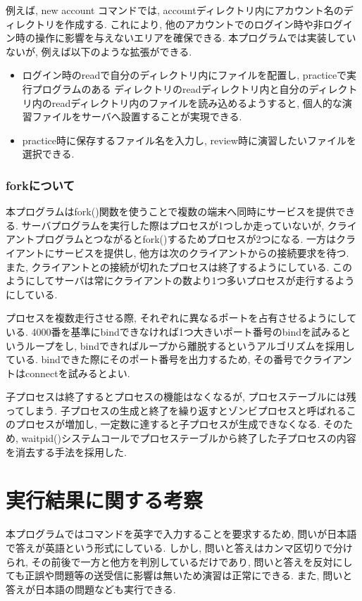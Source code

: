 \documentclass[a4j]{jarticle}
\begin{document}
例えば, new account コマンドでは, accountディレクトリ内にアカウント名のディレクトリを作成する. 
これにより, 他のアカウントでのログイン時や非ログイン時の操作に影響を与えないエリアを確保できる.
本プログラムでは実装していないが, 例えば以下のような拡張ができる.
\begin{itemize}
\item ログイン時のreadで自分のディレクトリ内にファイルを配置し, practiceで実行プログラムのある
ディレクトリのreadディレクトリ内と自分のディレクトリ内のreadディレクトリ内のファイルを読み込めるようすると, 
個人的な演習ファイルをサーバへ設置することが実現できる. 
\item practice時に保存するファイル名を入力し, review時に演習したいファイルを選択できる.
\end{itemize}

\subsubsection{forkについて}
本プログラムはfork()関数を使うことで複数の端末へ同時にサービスを提供できる. 
サーバプログラムを実行した際はプロセスが1つしか走っていないが, クライアントプログラムとつながるとfork()するためプロセスが2つになる. 一方はクライアントにサービスを提供し, 他方は次のクライアントからの接続要求を待つ.
また, クライアントとの接続が切れたプロセスは終了するようにしている. 
このようにしてサーバは常にクライアントの数より1つ多いプロセスが走行するようにしている.

プロセスを複数走行させる際, それぞれに異なるポートを占有させるようにしている. 4000番を基準にbindできなければ1つ大きいポート番号のbindを試みるというループをし, bindできればループから離脱するというアルゴリズムを採用している. bindできた際にそのポート番号を出力するため, その番号でクライアントはconnectを試みるとよい. 

子プロセスは終了するとプロセスの機能はなくなるが, プロセステーブルには残ってしまう. 子プロセスの生成と終了を繰り返すとゾンビプロセスと呼ばれるこのプロセスが増加し, 一定数に達すると子プロセスが生成できなくなる. そのため, waitpid()システムコールでプロセステーブルから終了した子プロセスの内容を消去する手法を採用した. 

\section{実行結果に関する考察}
本プログラムではコマンドを英字で入力することを要求するため, 問いが日本語で答えが英語という形式にしている.
しかし, 問いと答えはカンマ区切りで分けられ, その前後で一方と他方を判別しているだけであり, 問いと答えを反対にしても正誤や問題等の送受信に影響は無いため演習は正常にできる. また, 問いと答えが日本語の問題なども実行できる. 
\end{document}

